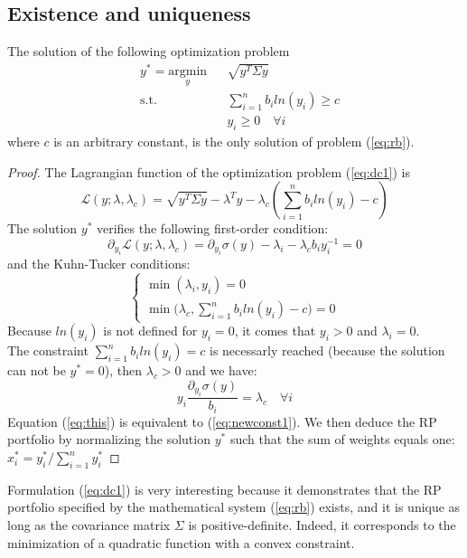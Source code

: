 \subsection{Existence and uniqueness}\label{par:existence}
\begin{theorem}
The solution of the following optimization problem
\begin{equation}\label{eq:dc1}
\begin{aligned}
& y^* = \underset{y}{\text{argmin}}
&& \sqrt{y^T \Sigma y}\\
& \text{s.t.}
&&\sum_{i=1}^n b_i ln(y_i) \geq c\\
&&&y_i \geq 0 \hspace{1em} \forall i
\end{aligned}
\end{equation}
where $c$ is an arbitrary constant, is the only solution of problem (\ref{eq:rb}).
\end{theorem} 
\begin{proof}
The Lagrangian function of the optimization problem (\ref{eq:dc1}) is
\begin{equation}
\mathcal{L}(y;\lambda,\lambda_c) = \sqrt{y^T \Sigma y} - \lambda^Ty - \lambda_c\left(\sum_{i=1}^n b_i ln(y_i) - c\right)
\end{equation}
The solution $y^*$ verifies the following first-order condition:
\begin{equation}
\partial_{y_i}\mathcal{L}(y;\lambda,\lambda_c) = \partial_{y_i}\sigma(y) - \lambda_i - \lambda_c b_i y_i^{-1} = 0
\end{equation}
and the Kuhn-Tucker conditions:
\begin{equation}
\begin{cases}
\min(\lambda_i,y_i)=0\\
\min\big(\lambda_c,\sum_{i=1}^n b_i ln(y_i) - c\big) = 0
\end{cases}
\end{equation}
Because $ln(y_i)$ is not defined for $y_i = 0$, it comes that $y_i > 0$ and $\lambda_i = 0$.\\
The constraint $\sum_{i=1}^n b_i ln(y_i) = c$ is necessarly reached (because the solution can not be $y^* = 0$), then $\lambda_c >0$ and we have:
\begin{equation}\label{eq:this}
y_i \frac{\partial_{y_i}\sigma(y)}{b_i}= \lambda_c \hspace{1em} \forall i
\end{equation}
Equation (\ref{eq:this}) is equivalent to (\ref{eq:newconst1}). We then deduce the RP portfolio by normalizing the solution $y^*$ such that the sum of weights equals one: $x_i^* =y_i^*/\sum_{i=1}^n y_i^*$
\end{proof}
Formulation (\ref{eq:dc1}) is very interesting because it demonstrates that the RP portfolio specified by the mathematical system (\ref{eq:rb}) exists, and it is unique as long as the covariance matrix $\Sigma$ is positive-definite. Indeed, it corresponds to the minimization of a quadratic function with a convex constraint.

